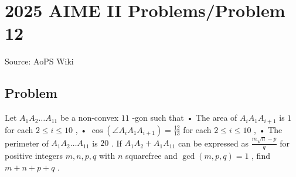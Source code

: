\documentclass[12pt]{article}
\begin{document}
\section*{{2025 AIME II Problems/Problem 12}}
Source: AoPS Wiki

\subsection*{Problem}
Let $A_1A_2\dots A_{11}$ be a non-convex $11$ -gon such that • The area of $A_iA_1A_{i+1}$ is $1$ for each $2 \le i \le 10$ , • $\cos(\angle A_iA_1A_{i+1})=\frac{12}{13}$ for each $2 \le i \le 10$ , • The perimeter of $A_1A_2\dots A_{11}$ is $20$ . If $A_1A_2+A_1A_{11}$ can be expressed as $\frac{m\sqrt{n}-p}{q}$ for positive integers $m,n,p,q$ with $n$ squarefree and $\gcd(m,p,q)=1$ , find $m+n+p+q$ .
\end{document}
